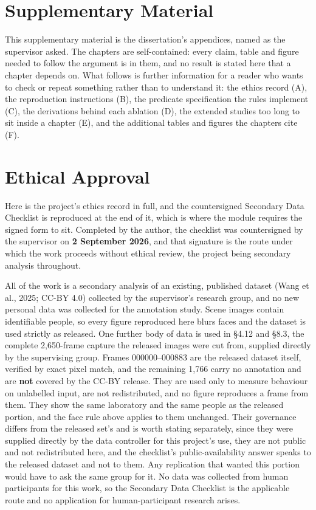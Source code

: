\chapter*{Supplementary Material}
This supplementary material is the dissertation's appendices, named as the supervisor asked. The chapters are self-contained: every claim, table and figure needed to follow the argument is in them, and no result is stated here that a chapter depends on. What follows is further information for a reader who wants to check or repeat something rather than to understand it: the ethics record (A), the reproduction instructions (B), the predicate specification the rules implement (C), the derivations behind each ablation (D), the extended studies too long to sit inside a chapter (E), and the additional tables and figures the chapters cite (F).

\chapter{Ethical Approval}


Here is the project's ethics record in full, and the countersigned Secondary Data Checklist is reproduced at the end of it, which is where the module requires the signed form to sit. Completed by the author, the checklist was countersigned by the supervisor on \textbf{2 September 2026}, and that signature is the route under which the work proceeds without ethical review, the project being secondary analysis throughout.

All of the work is a secondary analysis of an existing, published dataset (Wang et al., 2025; CC-BY 4.0) collected by the supervisor's research group, and no new personal data was collected for the annotation study. Scene images contain identifiable people, so every figure reproduced here blurs faces and the dataset is used strictly as released. One further body of data is used in \S{}4.12 and \S{}8.3, the complete 2,650-frame capture the released images were cut from, supplied directly by the supervising group. Frames 000000--000883 are the released dataset itself, verified by exact pixel match, and the remaining 1,766 carry no annotation and are \textbf{not} covered by the CC-BY release. They are used only to measure behaviour on unlabelled input, are not redistributed, and no figure reproduces a frame from them. They show the same laboratory and the same people as the released portion, and the face rule above applies to them unchanged. Their governance differs from the released set's and is worth stating separately, since they were supplied directly by the data controller for this project's use, they are not public and not redistributed here, and the checklist's public-availability answer speaks to the released dataset and not to them. Any replication that wanted this portion would have to ask the same group for it. No data was collected from human participants for this work, so the Secondary Data Checklist is the applicable route and no application for human-participant research arises.


